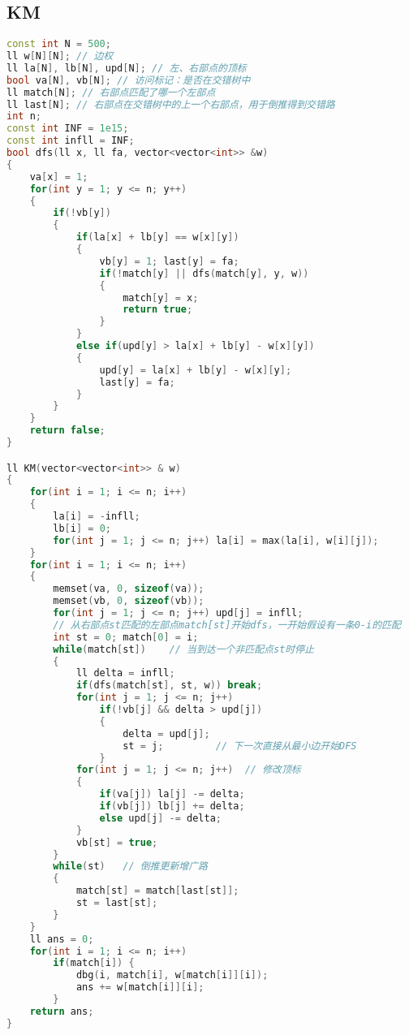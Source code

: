 \subsection{KM}
\begin{lstlisting}[language=c++]
const int N = 500;
ll w[N][N]; // 边权
ll la[N], lb[N], upd[N]; // 左、右部点的顶标
bool va[N], vb[N]; // 访问标记：是否在交错树中
ll match[N]; // 右部点匹配了哪一个左部点
ll last[N]; // 右部点在交错树中的上一个右部点，用于倒推得到交错路
int n;
const int INF = 1e15;
const int infll = INF;
bool dfs(ll x, ll fa, vector<vector<int>> &w) 
{
    va[x] = 1;
    for(int y = 1; y <= n; y++)
    {
        if(!vb[y])
        {
            if(la[x] + lb[y] == w[x][y]) 
            { 
                vb[y] = 1; last[y] = fa;
                if(!match[y] || dfs(match[y], y, w)) 
                {
                    match[y] = x;
                    return true;
                }
            }
            else if(upd[y] > la[x] + lb[y] - w[x][y]) 
            {
                upd[y] = la[x] + lb[y] - w[x][y];
                last[y] = fa;
            }
        }
    }
    return false;
}

ll KM(vector<vector<int>> & w) 
{
    for(int i = 1; i <= n; i++) 
    {
        la[i] = -infll;
        lb[i] = 0;
        for(int j = 1; j <= n; j++) la[i] = max(la[i], w[i][j]);
    }
    for(int i = 1; i <= n; i++) 
    {
        memset(va, 0, sizeof(va));
        memset(vb, 0, sizeof(vb));
        for(int j = 1; j <= n; j++) upd[j] = infll;
        // 从右部点st匹配的左部点match[st]开始dfs，一开始假设有一条0-i的匹配
        int st = 0; match[0] = i;
        while(match[st])    // 当到达一个非匹配点st时停止
        { 
            ll delta = infll;
            if(dfs(match[st], st, w)) break;
            for(int j = 1; j <= n; j++)
                if(!vb[j] && delta > upd[j]) 
                {
                    delta = upd[j];
                    st = j;         // 下一次直接从最小边开始DFS
                }
            for(int j = 1; j <= n; j++)  // 修改顶标
            {
                if(va[j]) la[j] -= delta;
                if(vb[j]) lb[j] += delta; 
                else upd[j] -= delta;
            }
            vb[st] = true;
        }
        while(st)   // 倒推更新增广路 
        { 
            match[st] = match[last[st]];
            st = last[st];
        }
    }
    ll ans = 0;
    for(int i = 1; i <= n; i++) 
        if(match[i]) {
            dbg(i, match[i], w[match[i]][i]);
            ans += w[match[i]][i];
        }
    return ans;
}


\end{lstlisting}
